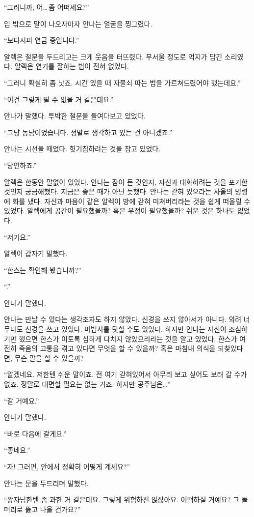 ``그러니까, 어\ldots\,좀 어떠세요?''

입 밖으로 말이 나오자마자 안나는 얼굴을 찡그렸다.

``보다시피 연금 중입니다.''

알렉은 철문을 두드리고는 크게 웃음을 터뜨렸다. 무서울 정도로 억지가 담긴 소리였다. 알렉은 연기를 잘하는 법이 전혀 없었다.

``그러니 확실히 좀 낫죠. 시간 있을 때 자물쇠 따는 법을 가르쳐드렸어야 했는데요.''

``이건 그렇게 딸 수 없을 거 같은데요.''

안나가 말했다. 투박한 철문을 들여다보고 있었다.

``그냥 농담이었습니다. 정말로 생각하고 있는 건 아니겠죠.''

안나는 시선을 떼었다. 헛기침하려는 것을 참고 있었다.

``당연하죠.''

알렉은 한동안 말없이 있었다. 안나는 잠이 든 것인지, 자신과 대화하려는 것을 포기한 것인지 궁금해했다. 지금은 좋은 때가 아닌 듯했다. 안나는 갇혀 있으라는 사울의 명령에 화를 냈다. 자신과 마음이 같은 알렉이 방에 갇혀 미쳐버리라는 것을 쉽게 떠올릴 수 있었다. 알렉에게 공간이 필요했을까? 혹은 우정이 필요했을까? 쉬운 것은 하나도 없었다.

``저기요.''

알렉이 갑자기 말했다.

``한스는 확인해 봤습니까?''

``.''

안나가 말했다.

안나는 만날 수 있다는 생각조차도 하지 않았다. 신경을 쓰지 않아서가 아니다. 외려 너무나도 신경을 쓰고 있었다. 마법사를 탓할 수도 있었다. 하지만 안나는 자신이 조심하기만 했으면 한스가 이토록 심하게 다치지 않았으리라는 것을 알고 있었다. 한스가 여전히 죽음의 고통을 겪고 있다면 무엇을 할 수 있을까? 혹은 마침내 의식을 되찾았다면, 무슨 말을 할 수 있을까?

``알겠네요. 저한텐 쉬운 말이죠. 전 여기 갇혀있어서 아무리 보고 싶어도 보러 갈 수가 없죠. 정말로 대면할 필요는 없는 거죠. 하지만 공주님은\ldots''

``갈 거예요.''

안나가 말했다.

``바로 다음에 갈게요.''

`` 좋네요.''

``자! 그러면, 안에서 정확히 어떻게 계세요?''

안나는 문을 두드리며 말했다.

``왕자님한텐 좀 과한 거 같은데요. 그렇게 위험하진 않잖아요. 어떡하실 거예요? 그 돌머리로 뚫고 나올 건가요?''

